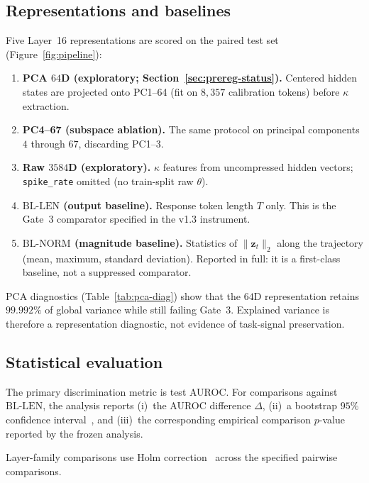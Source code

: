\documentclass{article}
\newcommand{\bllen}{\mathrm{BL\text{-}LEN}}
\newcommand{\blnorm}{\mathrm{BL\text{-}NORM}}
\begin{document}
\subsection{Representations and baselines}
\label{sec:baselines}

Five Layer~16 representations are scored on the paired test set (Figure~\ref{fig:pipeline}):
\begin{enumerate}[leftmargin=1.4em,itemsep=2pt]
\item \textbf{{PCA} $64${D} (exploratory; Section~\ref{sec:prereg-status}).}
Centered hidden states are projected onto {PC1}--{64} (fit on $8{,}357$ calibration tokens) before $\kappa$ extraction.
\item \textbf{{PC4}--{67} (subspace ablation).}
The same protocol on principal components $4$ through $67$, discarding {PC1}--{3}.
\item \textbf{Raw $3584${D} (exploratory).}
$\kappa$ features from uncompressed hidden vectors; \texttt{spike\_rate} omitted (no train-split raw $\theta$).
\item \textbf{$\bllen$ (output baseline).}
Response token length $T$ only. This is the Gate~3 comparator specified in the v1.3 instrument.
\item \textbf{$\blnorm$ (magnitude baseline).}
Statistics of $\lVert\mathbf{z}_t\rVert_2$ along the trajectory (mean, maximum, standard deviation). Reported in full: it is a first-class baseline, not a suppressed comparator.
\end{enumerate}

{PCA} diagnostics (Table~\ref{tab:pca-diag}) show that the $64${D} representation retains $99.992\%$ of global variance while still failing Gate~3. Explained variance is therefore a representation diagnostic, not evidence of task-signal preservation.

\subsection{Statistical evaluation}
\label{sec:stats}

The primary discrimination metric is test {AUROC}.
For comparisons against $\bllen$, the analysis reports
(i)~the {AUROC} difference $\Delta$,
(ii)~a bootstrap $95\%$ confidence interval~\citep{efron1993}, and
(iii)~the corresponding empirical comparison $p$-value reported by the frozen analysis.

Layer-family comparisons use Holm correction~\citep{holm1979} across the specified pairwise comparisons.
\end{document}
